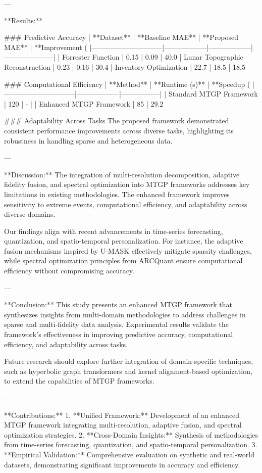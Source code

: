 ---

**Results:**  

### Predictive Accuracy  
| **Dataset**                  | **Baseline MAE** | **Proposed MAE** | **Improvement (%
|------------------------------|------------------|------------------|---------------------|  
| Forrester Function           | 0.15             | 0.09             | 40.0%
| Lunar Topographic Reconstruction | 0.23             | 0.16             | 30.4%
| Inventory Optimization       | 22.7             | 18.5             | 18.5%

### Computational Efficiency  
| **Method**                   | **Runtime (s)**  | **Speedup (%
|------------------------------|------------------|-----------------|  
| Standard MTGP Framework      | 120             | -               |  
| Enhanced MTGP Framework      | 85              | 29.2%

### Adaptability Across Tasks  
The proposed framework demonstrated consistent performance improvements across diverse tasks, highlighting its robustness in handling sparse and heterogeneous data.  

---

**Discussion:**  
The integration of multi-resolution decomposition, adaptive fidelity fusion, and spectral optimization into MTGP frameworks addresses key limitations in existing methodologies. The enhanced framework improves sensitivity to extreme events, computational efficiency, and adaptability across diverse domains.  

Our findings align with recent advancements in time-series forecasting, quantization, and spatio-temporal personalization. For instance, the adaptive fusion mechanisms inspired by U-MASK effectively mitigate sparsity challenges, while spectral optimization principles from ARCQuant ensure computational efficiency without compromising accuracy.  

---

**Conclusion:**  
This study presents an enhanced MTGP framework that synthesizes insights from multi-domain methodologies to address challenges in sparse and multi-fidelity data analysis. Experimental results validate the framework's effectiveness in improving predictive accuracy, computational efficiency, and adaptability across tasks.  

Future research should explore further integration of domain-specific techniques, such as hyperbolic graph transformers and kernel alignment-based optimization, to extend the capabilities of MTGP frameworks.  

---

**Contributions:**  
1. **Unified Framework:** Development of an enhanced MTGP framework integrating multi-resolution, adaptive fusion, and spectral optimization strategies.  
2. **Cross-Domain Insights:** Synthesis of methodologies from time-series forecasting, quantization, and spatio-temporal personalization.  
3. **Empirical Validation:** Comprehensive evaluation on synthetic and real-world datasets, demonstrating significant improvements in accuracy and efficiency.  